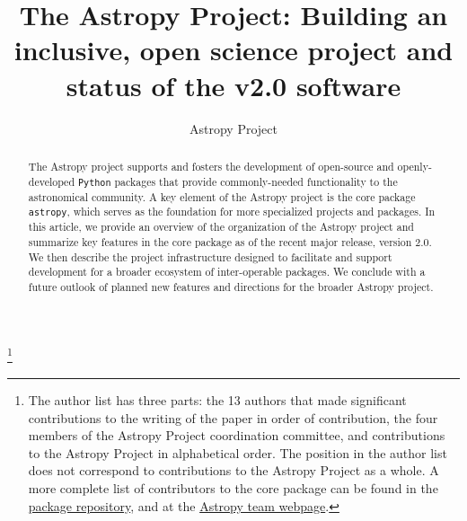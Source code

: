 \documentclass[modern]{aastex61}
\newcommand{\package}[1]{\texttt{#1}\xspace}
\newcommand{\python}{\package{Python}}
\newcommand{\astropy}{Astropy\xspace}
\newcommand{\astropypkg}{\package{astropy}}
\begin{document}
\draft{\today}

\title{The Astropy Project: Building an inclusive, open science project and status of the v2.0 software}


\author{Astropy Project}
\noaffiliation
\footnote{The author list has three parts: the 13 authors that made significant contributions to the  writing of the paper in order of contribution, the four members of the \astropy Project coordination committee, and contributions to the \astropy Project in alphabetical order.  The position in the author list does not correspond to contributions to the \astropy Project as a whole.  A more complete list of contributors to the core package can be found in the \href{https://github.com/astropy/astropy/graphs/contributors}{package repository}, and at the \href{http://www.astropy.org/team.html}{\astropy team webpage}.}



\begin{abstract}
The \astropy project supports and fosters the development of open-source and openly-developed
\python packages that provide commonly-needed functionality to the astronomical
community.
A key element of the \astropy project is the core package \astropypkg, which serves as the
foundation for more specialized projects and packages.
In this article, we provide an overview of the organization of the \astropy
project and summarize key features in the core package as of the recent major
release, version 2.0.
We then describe the project infrastructure designed to facilitate and support
development for a broader ecosystem of inter-operable packages.
We conclude with a future outlook of planned new features and directions for the
broader \astropy project.
\end{abstract}

\end{document}
